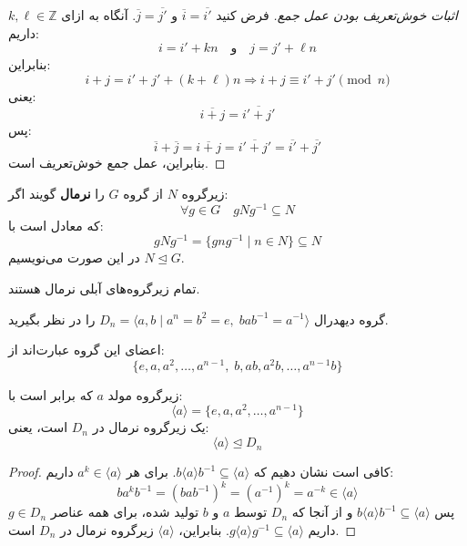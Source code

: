 \begin{proof}[اثبات خوش‌تعریف بودن عمل جمع]
    فرض کنید \( \overline{i} = \overline{i'} \) و \( \overline{j} = \overline{j'} \).  
    آنگاه به ازای \( k, \ell \in \mathbb{Z} \) داریم:
    \[
        i = i' + kn \quad \text{و} \quad j = j' + \ell n
    \]
    بنابراین:
    \[
        i + j = i' + j' + (k + \ell)n \Rightarrow i + j \equiv i' + j' \pmod{n}
    \]
    یعنی:
    \[
        \overline{i + j} = \overline{i' + j'}
    \]
    پس:
    \[
        \overline{i} + \overline{j} = \overline{i + j} = \overline{i' + j'} = \overline{i'} + \overline{j'}
    \]
    بنابراین، عمل جمع خوش‌تعریف است.
\end{proof}
\begin{definition}
    زیرگروه \( N \) از گروه \( G \) را \textbf{نرمال} گویند اگر:
    \[
        \forall g \in G \quad gNg^{-1} \subseteq N
    \]
    که معادل است با:
    \[
        gNg^{-1} = \{ gng^{-1} \mid n \in N \} \subseteq N
    \]
    در این صورت می‌نویسیم \( N \trianglelefteq G \).
    
\end{definition}
\begin{example}
    تمام زیرگروه‌های آبلی نرمال هستند.
\end{example}
\begin{example}
    گروه دیهدرال \( D_n = \langle a, b \mid a^n = b^2 = e,\; bab^{-1} = a^{-1} \rangle \) را در نظر بگیرید.
    
    اعضای این گروه عبارت‌اند از:
    \[
        \{ e, a, a^2, \ldots, a^{n-1},\; b, ab, a^2b, \ldots, a^{n-1}b \}
    \]
    
    زیرگروه مولد \( a \) که برابر است با:
    \[
        \langle a \rangle = \{ e, a, a^2, \ldots, a^{n-1} \}
    \]
    یک زیرگروه نرمال در \( D_n \) است، یعنی:
    \[
        \langle a \rangle \trianglelefteq D_n
    \]
\end{example}

\begin{proof}
    کافی است نشان دهیم که \( b \langle a \rangle b^{-1} \subseteq \langle a \rangle \).  
    برای هر \( a^k \in \langle a \rangle \) داریم:
    \[
        b a^k b^{-1} = (bab^{-1})^k = (a^{-1})^k = a^{-k} \in \langle a \rangle
    \]
    پس \( b \langle a \rangle b^{-1} \subseteq \langle a \rangle \) و از آنجا که \( D_n \) توسط \( a \) و \( b \) تولید شده، برای همه عناصر \( g \in D_n \) داریم \( g \langle a \rangle g^{-1} \subseteq \langle a \rangle \).  
    بنابراین، \( \langle a \rangle \) زیرگروه نرمال در \( D_n \) است.
\end{proof}

